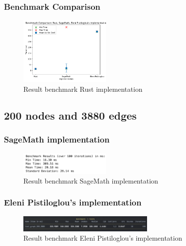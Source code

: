 \subsubsection*{Benchmark Comparison}
\begin{figure}[!h]
    \centering
    \includegraphics[width=0.40\textwidth]{images/benchmark/graph_200_3896/benchmark_comparison_graph_200_3896}
    \caption{Result benchmark Rust implementation}
    \label{fig:benchmark-comparison-graph-200-3896}
\end{figure}

\newpage


\subsection{200 nodes and 3880 edges}\label{subsec:result-for-graphs-200-3880}

\subsubsection*{SageMath implementation}
\begin{figure}[!h]
    \centering
    \includegraphics[width=0.40\textwidth]{images/benchmark/graph_200_3880/benchmark_graph_200_3880_sagemath}
    \caption{Result benchmark SageMath implementation}
    \label{fig:benchmark-graph-200-3880-sagemath}
\end{figure}

\subsubsection*{Eleni Pistiloglou's implementation}
\begin{figure}[!h]
    \centering
    \includegraphics[width=0.60\textwidth]{images/benchmark/graph_200_3880/benchmark_graph_200_3880_python}
    \caption{Result benchmark Eleni Pistiloglou's implementation}
    \label{fig:benchmark-graph-200-3880-python}
\end{figure}

